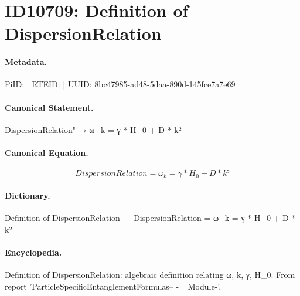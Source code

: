 \section*{ID10709: Definition of DispersionRelation}
\paragraph{Metadata.}
PiID:  | RTEID:  | UUID: 8bc47985-ad48-5daa-890d-145fce7a7e69

\paragraph{Canonical Statement.}
DispersionRelation" → ω\_k = γ * H\_0 + D * k²

\paragraph{Canonical Equation.}
\[
DispersionRelation = ω_k = γ * H_0 + D * k²
\]

\paragraph{Dictionary.}
Definition of DispersionRelation — DispersionRelation = ω\_k = γ * H\_0 + D * k²

\paragraph{Encyclopedia.}
Definition of DispersionRelation: algebraic definition relating ω, k, γ, H\_0. From report 'ParticleSpecificEntanglementFormulas-- -= Module-'.
